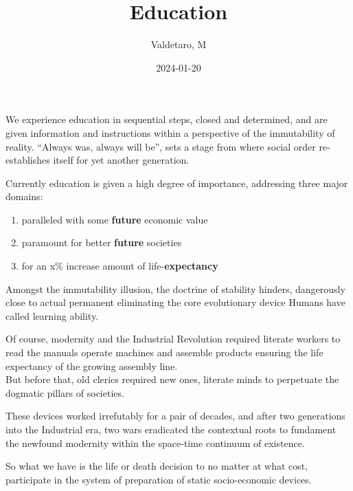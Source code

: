 \documentclass[
  letterpaper,
  DIV=11,
  numbers=noendperiod,
  oneside]{scrartcl}
\title{Education}
\author{Valdetaro, M}
\date{2024-01-20}
\renewcommand*\contentsname{Table of contents}
\newcommand\contentsname{Table of contents}
\begin{document}
\maketitle
\ifdefined\Shaded\renewenvironment{Shaded}{\begin{tcolorbox}[frame hidden, sharp corners, interior hidden, enhanced, borderline west={3pt}{0pt}{shadecolor}, breakable, boxrule=0pt]}{\end{tcolorbox}}\fi

\renewcommand*\contentsname{Table of contents}
{
\hypersetup{linkcolor=}
\setcounter{tocdepth}{9}
\tableofcontents
}
We experience education in sequential steps, closed and determined, and
are given information and instructions within a perspective of the
immutability of reality. ``Always was, always will be'', sets a stage
from where social order re-establishes itself for yet another
generation.

Currently education is given a high degree of importance, addressing
three major domains:

\begin{enumerate}
\def\labelenumi{\arabic{enumi}.}
\item
  paralleled with some \textbf{future} economic value
\item
  paramount for better \textbf{future} societies
\item
  for an x\% increase amount of life-\textbf{expectancy}
\end{enumerate}

Amongst the immutability illusion, the doctrine of stability hinders,
dangerously close to actual permanent eliminating the core evolutionary
device Humans have called learning ability.

Of course, modernity and the Industrial Revolution required literate
workers to read the manuals operate machines and assemble products
ensuring the life expectancy of the growing assembly line.\\
But before that, old clerics required new ones, literate minds to
perpetuate the dogmatic pillars of societies.

These devices worked irrefutably for a pair of decades, and after two
generations into the Industrial era, two wars eradicated the contextual
roots to fundament the newfound modernity within the space-time
continuum of existence.

So what we have is the life or death decision to no matter at what cost,
participate in the system of preparation of static socio-economic
devices.
\end{document}
